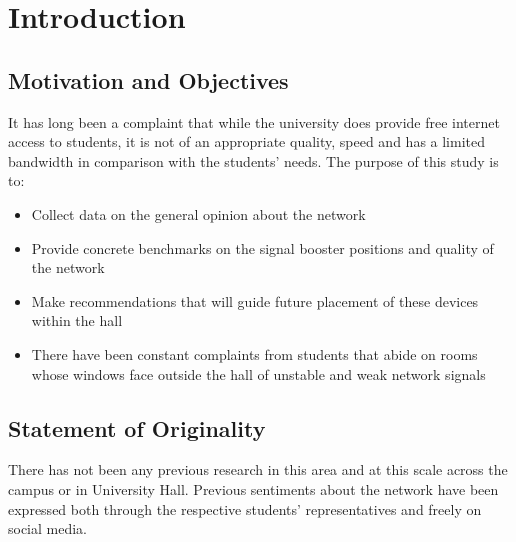 
\chapter{Introduction}

\section{Motivation and Objectives}

It has long been a complaint that while the university does provide free internet access to students, it is not of an appropriate quality, speed and has a limited bandwidth in comparison with the students' needs.
The purpose of this study is to:
 \begin{itemize}
     \item Collect data on the general opinion about the network
     \item Provide concrete benchmarks on the signal booster positions and quality of the network
     \item Make recommendations that will guide future placement of these devices within the hall
     \item There have been constant complaints from students that abide on rooms whose windows face outside the hall of unstable and weak network signals
 \end{itemize}



\section{Statement of Originality}

There has not been any previous research in this area and at this scale across the campus or in University Hall. Previous sentiments about the network have been expressed both through the respective students' representatives and freely on social media.